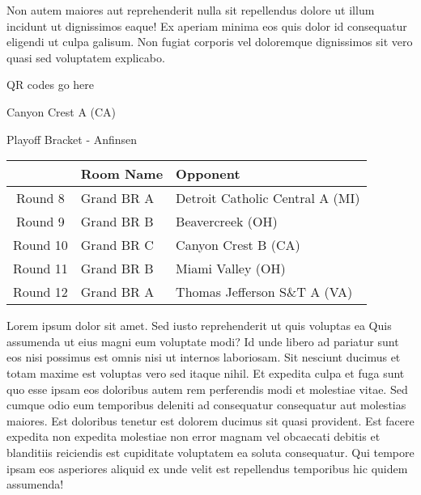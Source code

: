 \documentclass{article}%
\begin{document}
\newline%
Non autem maiores aut reprehenderit nulla sit repellendus dolore ut illum incidunt ut dignissimos eaque! Ex aperiam minima eos quis dolor id consequatur eligendi ut culpa galisum. Non fugiat corporis vel doloremque dignissimos sit vero quasi sed voluptatem explicabo.\newline%
\newline%
%
\vspace*{30pt}%
\begin{center}%
\begin{Huge}%
QR codes go here%
\end{Huge}%
\end{center}%
\newpage%
\begin{center}%
\begin{Huge}%
Canyon Crest A (CA)%
\end{Huge}%
\vspace*{8pt}%
\linebreak%
\begin{Large}%
Playoff Bracket {-} Anfinsen%
\end{Large}%
\end{center}%
\begin{tabularx}{\textwidth}{|c|Y|Y|}%
\hline%
&Room Name&Opponent\\%
\hline%
Round 8&Grand BR A&Detroit Catholic Central A (MI)\\%
Round 9&Grand BR B&Beavercreek (OH)\\%
Round 10&Grand BR C&Canyon Crest B (CA)\\%
Round 11&Grand BR B&Miami Valley (OH)\\%
Round 12&Grand BR A&Thomas Jefferson S\&T A (VA)\\%
\hline%
\end{tabularx}%
\vspace*{8pt}%
\linebreak%
\newline%
\newline%
Lorem ipsum dolor sit amet. Sed iusto reprehenderit ut quis voluptas ea Quis assumenda ut eius magni eum voluptate modi? Id unde libero ad pariatur sunt eos nisi possimus est omnis nisi ut internos laboriosam. Sit nesciunt ducimus et totam maxime est voluptas vero sed itaque nihil. Et expedita culpa et fuga sunt quo esse ipsam eos doloribus autem rem perferendis modi et molestiae vitae.\newline%
\newline%
Sed cumque odio eum temporibus deleniti ad consequatur consequatur aut molestias maiores. Est doloribus tenetur est dolorem ducimus sit quasi provident. Est facere expedita non expedita molestiae non error magnam vel obcaecati debitis et blanditiis reiciendis est cupiditate voluptatem ea soluta consequatur. Qui tempore ipsam eos asperiores aliquid ex unde velit est repellendus temporibus hic quidem assumenda!\newline%
\end{document}

